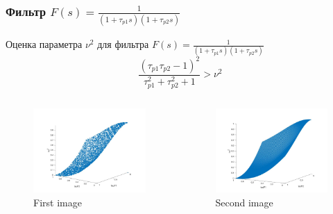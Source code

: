 \documentclass{beamer}
\begin{document}

\begin{frame}
\frametitle{Фильтр $F(s) = \frac{1}{(1+\tau_{p1}s)(1+\tau_{p2}s)}$}
Оценка параметра $\nu^2$ для фильтра $F(s) = \frac{1}{(1+\tau_{p1}s)(1+\tau_{p2}s)}$
\begin{equation*}
\frac{(\tau_{p1}\tau_{p2} - 1)^2}{\tau_{p1}^2 + \tau_{p2}^2 + 1} > \nu^2
\end{equation*} 
\begin{columns}[onlytextwidth]
\begin{column}{.45\textwidth}
\begin{figure}
  \includegraphics[width=\textwidth]{images/filter1e.jpg}
  \caption{First image}
\end{figure}
\end{column}
\hfill
\begin{column}{.45\textwidth}
\begin{figure}
  \includegraphics[width=\textwidth]{images/filter1_1.jpg}
  \caption{Second image}
\end{figure}
\end{column}
\end{columns}
\end{frame}
\end{document}
